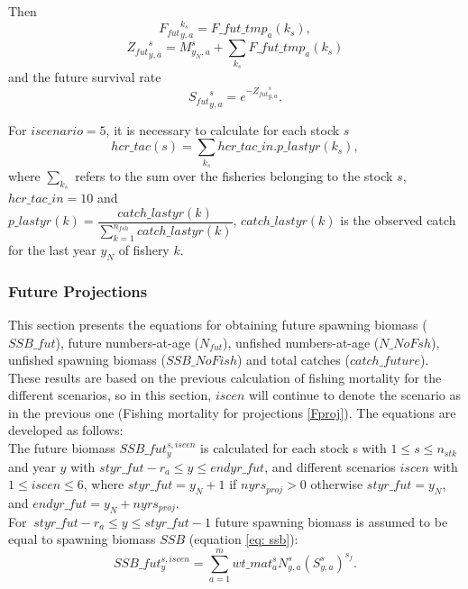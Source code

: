 \documentclass{article}
\begin{document}
Then 
\begin{equation} \label{ffut}
    {F_{fut}}^{k_s}_{y,a}   = F\_fut\_tmp_a({k_s}),
\end{equation}
\begin{equation} \label{zfut}
    {Z_{fut}}^s_{y,a}=M^s_{y_N,a}+\sum_{k_s}F\_fut\_tmp_a(k_s)
\end{equation}
and the future survival rate 
\begin{equation}
    {S_{fut}}^s_{y,a}=e^{-{Z_{fut}}^s_{y,a}}.
\end{equation}

For $iscenario = 5$, it is necessary to calculate for each stock $s$
\begin{equation}
    hcr\_tac(s) = \sum_{k_s} hcr\_tac\_in.p\_lastyr(k_s),
\end{equation}
where $\displaystyle\sum_{k_s}$ refers to the sum over the fisheries belonging to the stock $s$, $hcr\_tac\_in = 10$ and  \\ $p\_lastyr(k) = \dfrac{catch\_lastyr(k)}{\displaystyle\sum_{k=1}^{n_{fsh}}catch\_lastyr(k)}$, $catch\_lastyr(k)$ is the observed catch for the last year $y_N$ of fishery $k$.


\subsubsection{Future Projections} \label{futproj}
This section presents the equations for obtaining future spawning biomass ($SSB\_fut$), future numbers-at-age ($N_{fut}$), unfished numbers-at-age ($N\_NoFsh$), unfished spawning biomass ($SSB\_NoFish$)%
 and total catches ($catch\_future$). These results are based on the previous calculation of fishing mortality for the different scenarios, so in this section, $iscen$ will continue to denote the scenario as in the previous one (Fishing mortality for projections \ref{Fproj}). The equations are developed as follows:
\\

The future biomass $SSB\_fut^{s,iscen}_{y}$ is calculated for each stock s with $1 \leq s \leq n_{stk}$ and year $y$ with $styr\_fut-r_a\leq y \leq endyr\_fut$, and different scenarios $iscen$ with $1\leq iscen \leq 6$, where $styr\_fut=y_N+1$ if $nyrs_{proj}>0$ otherwise $styr\_fut=y_N$, and $endyr\_fut=y_N+nyrs_{proj}$.\\

For $\ styr\_fut-r_a\leq y \leq styr\_fut-1$ future spawning biomass is assumed to be equal to spawning biomass $SSB$ (equation \ref{eq: ssb}):
\begin{equation}
    SSB\_fut^{s,iscen}_y=\sum_{a=1}^m wt\_{mat}^s_a N^s_{y,a}(S^s_{y,a})^{s_f} .
\end{equation}
\end{document}
